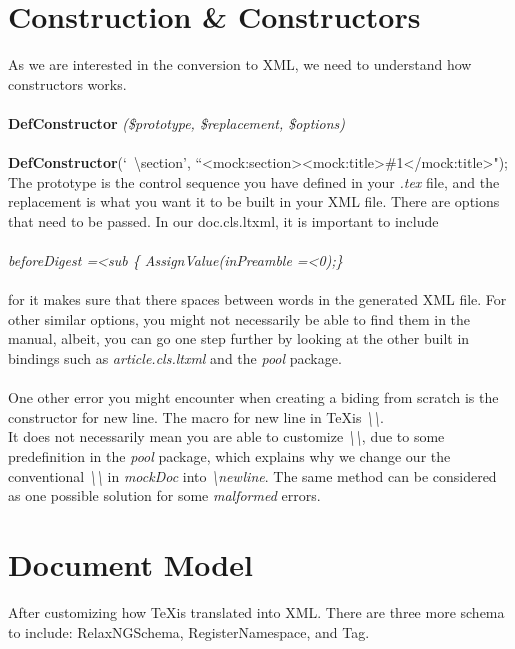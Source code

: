 \documentclass{book}
\begin{document}
\section{Construction \& Constructors}
As we are interested in the conversion to XML, we need to understand how constructors works. \\ \\
\textbf{DefConstructor} \emph{ (\$prototype, \$replacement, \$options) } \\ \\
\textbf{DefConstructor}(`\ \textbackslash section{}', ``\textless mock:section\textgreater\textless mock:title\textgreater \#1\textless/mock:title\textgreater");
The prototype is the control sequence you have defined in your \emph{.tex} file, and the replacement is what you want it to be built in your XML file. There 
are options that need to be passed. In our doc.cls.ltxml, it is important to include \\ \\
 \emph {beforeDigest =\textless sub \{ AssignValue(inPreamble =\textless 0);\}} \\ \\
 for it makes sure that there spaces between words in the generated XML file. For other similar options, you might not necessarily be able to find them in 
 the manual, albeit, you can go one step further by looking at the other built in bindings such as \emph {article.cls.ltxml} and the \emph {pool} package. \\ \\
 One other error you might encounter when creating a biding from scratch is the constructor for new line. The macro for new line in \TeX is  \emph{\textbackslash\textbackslash}. \\
 It does not necessarily mean you are able to customize  \emph{\textbackslash\textbackslash}, due to some predefinition in the \emph {pool} package, which explains 
 why we change our the conventional  \emph{\textbackslash\textbackslash} in \emph{mockDoc} into \emph{ \textbackslash newline}. The same method can be considered
 as one possible solution for some \emph{malformed} errors.

\section{Document Model}
After customizing how \TeX  is translated into XML. There are three more schema to include: RelaxNGSchema, RegisterNamespace, and Tag.
\end{document}
